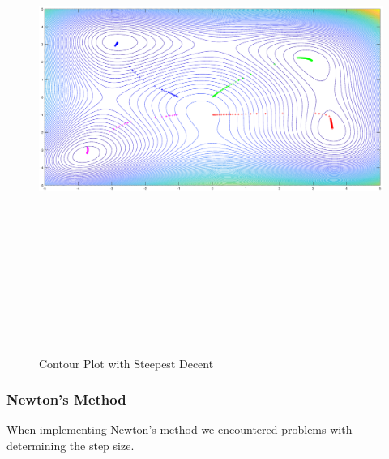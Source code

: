 \documentclass[12pt]{article}
\begin{document}
\begin{landscape}
\begin{figure}[h!]
    \centering
    \includegraphics[width=9in,height=6.5in]{SDM_Contour.eps}
    \caption{Contour Plot with Steepest Decent}
    \label{fig:SDM_Contour}
\end{figure}
\end{landscape}
\pagebreak
\subsubsection{Newton's Method}
When implementing Newton's method we encountered problems with determining the step size.
\end{document}
